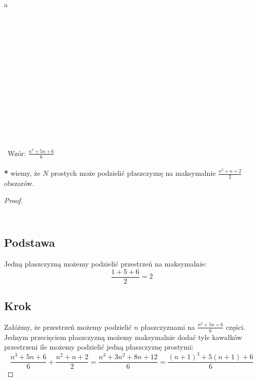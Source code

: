 \documentclass{article}
\begin{document}
a\\\\\\\\\\\\\\\\\\\\\\\\\\\\\\\
Wzór: $\frac{n^3+5n+6}{6}$\\\\
\textbf{*} wiemy, że $N$ prostych może podzielić płaszczyznę na maksymalnie $\frac{n^2 + n + 2}{2}$ obszarów.\\
\begin{proof}
\subsection*{\\Podstawa}
Jedną płaszczyzną możemy podzielić przestrzeń na maksymalnie:
$$
\frac{1+5+6}{2} = 2
$$
\subsection*{Krok}
Załóżmy, że przestrzeń możemy podzielić $n$ płaszczyznami na $\frac{n^3+5n+6}{6}$ części. Jednym przecięciem płaszczyzną możemy maksymalnie dodać tyle kawałków przestrzeni ile możemy podzielić jedną płaszczyznę prostymi:
$$
\frac{n^3+5n+6}{6} + \frac{n^2 + n + 2}{2} = \frac{n^3 + 3n^2 + 8n + 12}{6} = \frac{(n+1)^3 + 5(n+1) + 6}{6}
$$
\end{proof}
\end{document}
